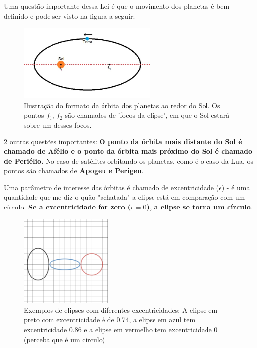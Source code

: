 \documentclass[12pt]{extarticle}
\newcommand{\<}{\langle}
\renewcommand{\>}{\rangle}
\theoremstyle{definition}
\begin{document}
Uma questão importante dessa Lei é que o movimento dos planetas é bem definido e pode ser visto na figura a seguir:
\begin{figure}[H]
    \centering
    \includegraphics[width=0.6\textwidth]{primeira_lei.jpg}
    \caption{Ilustração do formato da órbita dos planetas ao redor do Sol. Os pontos $f_1,\,f_2$ são chamados de 'focos da elipse', em que o Sol estará sobre um desses focos.}
    \label{fig:primeira_lei}
\end{figure}
2 outras questões importantes: \textbf{O ponto da órbita mais distante do Sol é chamado de Afélio e o ponto da órbita mais próximo do Sol é chamado de Periélio.} No caso de satélites orbitando os planetas, como é o caso da Lua, os pontos são chamados de \textbf{Apogeu e Perigeu}.

Uma parâmetro de interesse das órbitas é chamado de excentricidade ($\epsilon$) - é uma quantidade que me diz o quão "achatada" a elipse está em comparação com um círculo. \textbf{Se a excentricidade for zero ($\epsilon=0$), a elipse se torna um círculo.}
\begin{figure}[H]
    \centering
    \includegraphics[width=0.4\textwidth]{eccentricity.png}
    \caption{Exemplos de elipses com diferentes excentricidades: A elipse em preto com excentricidade é de 0.74, a elipse em azul tem excentricidade 0.86 e a elipse em vermelho tem excentricidade 0 (perceba que é um circulo)}
    \label{fig:excentricidade}
\end{figure}
\end{document}
